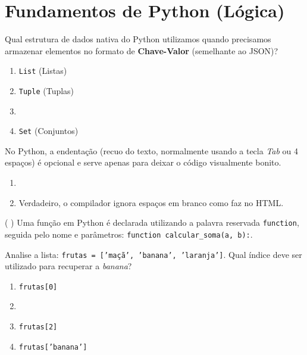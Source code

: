 \documentclass[12pt,a4paper]{article}
\newcommand{\correto}[1]{\iftoggle{gabarito}{\textbf{\color{corGabarito}#1}}{#1}}
\newcommand{\justificativa}[1]{\iftoggle{gabarito}{\vspace{0.2cm}\textbf{\color{corGabarito}Justificativa:} \color{corGabarito}#1}{\vspace{0.8cm}}}
\begin{document}
\newpage
\section{Fundamentos de Python (Lógica)}

\begin{tcolorbox}[colback=white, colframe=azulTitulo, title=Questão 6]
    Qual estrutura de dados nativa do Python utilizamos quando precisamos armazenar elementos no formato de \textbf{Chave-Valor} (semelhante ao JSON)?
    \begin{enumerate}[label=\alph*)]
        \item \texttt{List} (Listas)
        \item \texttt{Tuple} (Tuplas)
        \item \correto{\texttt{Dictionary} (Dicionários)}
        \item \texttt{Set} (Conjuntos)
    \end{enumerate}
\end{tcolorbox}

\begin{tcolorbox}[colback=white, colframe=azulTitulo, title=Questão 7]
    No Python, a endentação (recuo do texto, normalmente usando a tecla \textit{Tab} ou 4 espaços) é opcional e serve apenas para deixar o código visualmente bonito.
    \begin{enumerate}[label=\alph*)]
        \item \correto{Falso, a endentação é obrigatória e define os blocos lógicos de funções e laços.}
        \item Verdadeiro, o compilador ignora espaços em branco como faz no HTML.
    \end{enumerate}
\end{tcolorbox}

\begin{tcolorbox}[colback=white, colframe=azulTitulo, title=Questão 8 (V/F)]
    ( ) Uma função em Python é declarada utilizando a palavra reservada \texttt{function}, seguida pelo nome e parâmetros: \texttt{function calcular\_soma(a, b):}.
    \justificativa{Falso. Em Python a palavra-chave utilizada para definir funções é \texttt{def}.}
\end{tcolorbox}

\begin{tcolorbox}[colback=white, colframe=azulTitulo, title=Questão 9]
    Analise a lista: \texttt{frutas = ['maçã', 'banana', 'laranja']}. Qual índice deve ser utilizado para recuperar a \textit{banana}?
    \begin{enumerate}[label=\alph*)]
        \item \texttt{frutas[0]}
        \item \correto{\texttt{frutas[1]}}
        \item \texttt{frutas[2]}
        \item \texttt{frutas['banana']}
    \end{enumerate}
\end{tcolorbox}
\end{document}
